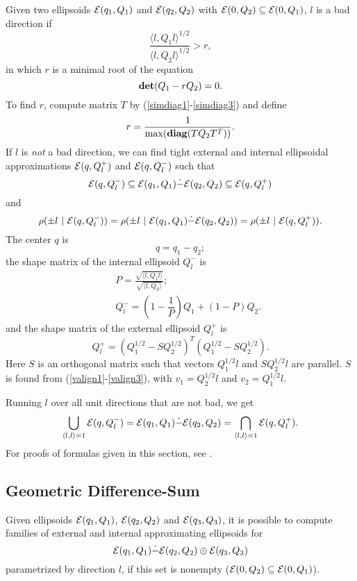 Given two ellipsoids $\EE(q_1,Q_1)$ and $\EE(q_2,Q_2)$ with
$\EE(0,Q_2)\subseteq\EE(0,Q_1)$, $l$ is a bad direction if
\[ \frac{\langle l,Q_1l\rangle^{1/2}}{\langle l,Q_2l\rangle^{1/2}}>r, \]
in which $r$ is a minimal root of the equation
\[ {\bf det}(Q_1-rQ_2) = 0. \]
To find $r$, compute matrix $T$ by (\ref{simdiag1}-\ref{simdiag3}) and define
\[ r = \frac{1}{\max({\bf diag}(TQ_2T^T))}. \]
If $l$ is {\it not} a bad direction, we can find tight external
and internal ellipsoidal approximations $\EE(q,Q^+_l)$ and
$\EE(q,Q^-_l)$ such that
\[ \EE(q,Q^-_l)\subseteq\EE(q_1,Q_1)\dot{-}\EE(q_2,Q_2)\subseteq\EE(q,Q^+_l) \]
and
\[ \rho(\pm l ~|~ \EE(q,Q_l^-)) =
\rho(\pm l ~|~ \EE(q_1,Q_1)\dot{-}\EE(q_2,Q_2)) =
\rho(\pm l ~|~ \EE(q,Q_l^+)).\]
The center $q$ is
\begin{equation}
q = q_1 - q_2;  \label{minkdiff_c}
\end{equation}
the shape matrix of the internal ellipsoid $Q^-_l$ is
\begin{eqnarray}
&& P = \frac{\sqrt{\langle l, Q_1 l\rangle}}{\sqrt{\langle l, Q_2 \rangle}};\nonumber\\
&& Q^-_l = \left(1 - \dfrac{1}{P}\right)Q_1 + \left(1 - P\right)Q_2.
\label{minkdiff_ia}
\end{eqnarray}
and the shape matrix of the external ellipsoid $Q^+_l$ is
\begin{equation}
Q^+_l = \left(Q_1^{1/2} - SQ_2^{1/2}\right)^T
\left(Q_1^{1/2} - SQ_2^{1/2}\right).  \label{minkdiff_ea}
\end{equation}
Here $S$ is an orthogonal matrix such that vectors $Q_1^{1/2}l$
and $SQ_2^{1/2}l$ are parallel.
 $S$ is found from (\ref{valign1}-\ref{valign3}), with
$v_1=Q_2^{1/2}l$ and $v_2=Q_1^{1/2}l$.

Running $l$ over all unit directions that are not bad, we get
\[ \bigcup_{\langle l,l\rangle=1} \EE(q,Q_l^-) =
\EE(q_1,Q_1)\dot{-}\EE(q_2,Q_2) =
\bigcap_{\langle l,l\rangle=1} \EE(q,Q_l^+) .\]
For proofs of formulas given in this section, see \cite{kurvalyi}.


\subsection{Geometric Difference-Sum}\label{subsec_diffsum}
Given ellipsoids $\EE(q_1,Q_1)$, $\EE(q_2,Q_2)$ and $\EE(q_3,Q_3)$, it is
possible to compute families of external and internal approximating
ellipsoids for
\begin{equation}
\EE(q_1,Q_1) \dot{-} \EE(q_2,Q_2) \oplus \EE(q_3,Q_3) \label{minkmp}
\end{equation}
parametrized by direction $l$, if this set is nonempty
($\EE(0,Q_2)\subseteq\EE(0,Q_1)$).

